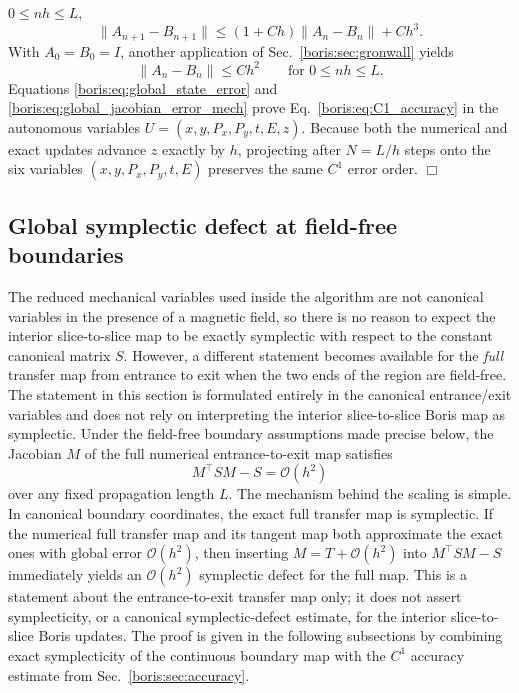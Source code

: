 \(0\le nh\le L\),
\[
\|A_{n+1}-B_{n+1}\|
\le
(1+Ch)\|A_n-B_n\| + Ch^3.
\]
With \(A_0=B_0=I\), another application of Sec.~\ref{boris:sec:gronwall} yields
\begin{equation}
\|A_n-B_n\|\le Ch^2
\qquad \text{for } 0\le nh\le L.
\label{boris:eq:global_jacobian_error_mech}
\end{equation}
Equations \eqref{boris:eq:global_state_error} and
\eqref{boris:eq:global_jacobian_error_mech} prove Eq.~\eqref{boris:eq:C1_accuracy} in the
autonomous variables \(U=(x,y,P_x,P_y,t,E,z)\).
Because both the numerical and exact updates advance \(z\) exactly by \(h\),
projecting after \(N=L/h\) steps onto the six variables
\((x,y,P_x,P_y,t,E)\) preserves the same \(C^1\) error order. \hfill\(\Box\)

\subsection{Global symplectic defect at field-free boundaries}
\label{boris:sec:sympldefect}

The reduced mechanical variables used inside the algorithm are not canonical
variables in the presence of a magnetic field, so there is no reason to expect
the interior slice-to-slice map to be exactly symplectic with respect to the
constant canonical matrix \(S\).
However, a different statement becomes available for the \emph{full} transfer
map from entrance to exit when the two ends of the region are field-free.
The statement in this section is formulated entirely in the canonical
entrance/exit variables and does not rely on interpreting the interior
slice-to-slice Boris map as symplectic.
Under the field-free boundary assumptions made precise below, the Jacobian \(M\)
of the full numerical entrance-to-exit map satisfies
\[
\boxed{M^\top S M - S = \mathcal O(h^2)}
\]
over any fixed propagation length \(L\).
The mechanism behind the scaling is simple.
In canonical boundary coordinates, the exact full transfer map is symplectic.
If the numerical full transfer map and its tangent map both approximate the
exact ones with global error \(\mathcal O(h^2)\), then inserting
\(M=T+\mathcal O(h^2)\) into \(M^\top S M-S\) immediately yields an
\(\mathcal O(h^2)\) symplectic defect for the full map.
This is a statement about the entrance-to-exit transfer map only; it does not
assert symplecticity, or a canonical symplectic-defect estimate, for the
interior slice-to-slice Boris updates.
The proof is given in the following subsections by combining exact symplecticity
of the continuous boundary map with the \(C^1\) accuracy estimate from
Sec.~\ref{boris:sec:accuracy}.

